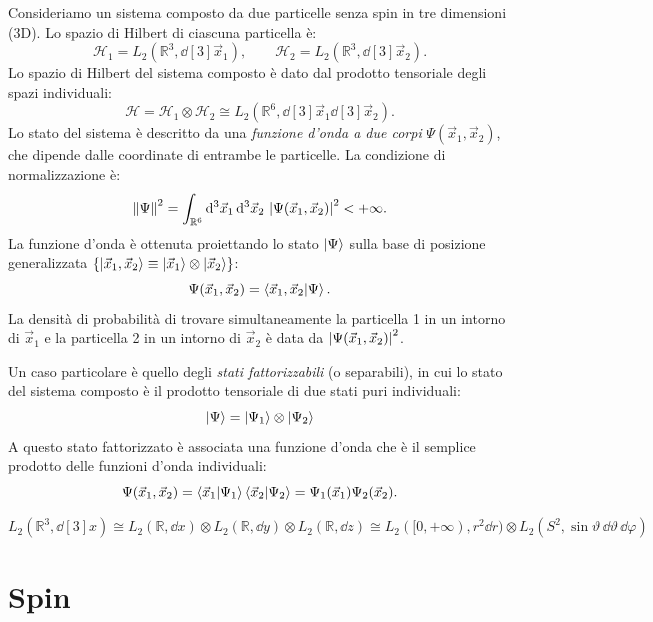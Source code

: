 \begin{example}
    
Consideriamo un sistema composto da due particelle senza spin in tre dimensioni (3D).
Lo spazio di Hilbert di ciascuna particella è:
\[
    \mathcal{H}_1 = L_2(\mathbb{R}^3, \dd[3]{\vec{x}_1}), \qquad \mathcal{H}_2 = L_2(\mathbb{R}^3, \dd[3]{\vec{x}_2}).
\]
Lo spazio di Hilbert del sistema composto è dato dal prodotto tensoriale degli spazi individuali:
\[
    \mathcal{H} = \mathcal{H}_1 \otimes \mathcal{H}_2 \cong L_2(\mathbb{R}^6, \dd[3]{\vec{x}_1} \dd[3]{\vec{x}_2}).
\]
Lo stato del sistema è descritto da una \textit{funzione d'onda a due corpi} \(\Psi(\vec{x}_1, \vec{x}_2)\), che dipende dalle coordinate di entrambe le particelle.
La condizione di normalizzazione è:
\[
    \norm{\Psi}^2 = \int_{\mathbb{R}^6} \dd[3]{\vec{x}_1} \dd[3]{\vec{x}_2} \, \abs{\Psi(\vec{x}_1, \vec{x}_2)}^2 < +\infty.
\]
La funzione d'onda è ottenuta proiettando lo stato \(\ket{\Psi}\) sulla base di posizione generalizzata \(\left\{ \ket{\vec{x}_1, \vec{x}_2} \equiv \ket{\vec{x}_1} \otimes \ket{\vec{x}_2} \right\}\):
\[
    \Psi(\vec{x}_1, \vec{x}_2) = \braket{\vec{x}_1, \vec{x}_2}{\Psi}.
\]
La densità di probabilità di trovare simultaneamente la particella 1 in un intorno di \(\vec{x}_1\) e la particella 2 in un intorno di \(\vec{x}_2\) è data da \(\abs{\Psi(\vec{x}_1, \vec{x}_2)}^2\).

Un caso particolare è quello degli \textit{stati fattorizzabili} (o separabili), in cui lo stato del sistema composto è il prodotto tensoriale di due stati puri individuali:
\[
    \ket{\Psi} = \ket{\Psi_1} \otimes \ket{\Psi_2}
\]
A questo stato fattorizzato è associata una funzione d'onda che è il semplice prodotto delle funzioni d'onda individuali:
\[
    \Psi(\vec{x}_1, \vec{x}_2) = \braket{\vec{x}_1}{\Psi_1} \braket{\vec{x}_2}{\Psi_2} = \Psi_1(\vec{x}_1) \Psi_2(\vec{x}_2).
\]
\end{example}

\begin{example}
    \[
        L_2(\mathbb{R}^3, \dd[3]{x}) \cong L_2(\mathbb{R}, \dd{x}) \otimes L_2(\mathbb{R}, \dd{y}) \otimes L_2(\mathbb{R}, \dd{z})
        \cong L_2([0,+\infty), r^2 \dd{r}) \otimes L_2(S^2, \sin\vartheta \, \dd{\vartheta} \, \dd{\varphi})    
    \]
\end{example}

\section{Spin}

